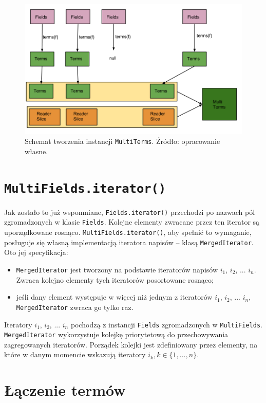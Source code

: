 \begin{figure}[here]
 \centering
 \includegraphics[scale=0.4]{pictures/MultiTerms.png}
 \caption{Schemat tworzenia instancji \texttt{MultiTerms}. Źródło: opracowanie własne. \label{fig:multiTerms}}
\end{figure}

\section{\texttt{MultiFields.iterator()}}

Jak zostało to już wspomniane, \texttt{Fields.iterator()} przechodzi po nazwach pól zgromadzonych w klasie \texttt{Fields}. Kolejne elementy zwracane przez ten iterator są uporządkowane rosnąco. \texttt{MultiFields.iterator()}, aby spełnić to wymaganie, posługuje się własną implementacją iteratora napisów -- klasą \texttt{MergedIterator}. Oto jej specyfikacja:
\begin{itemize}
 \item \texttt{MergedIterator} jest tworzony na podstawie iteratorów napisów $i_1$, $i_2$, ... $i_n$. Zwraca kolejno elementy tych iteratorów posortowane rosnąco; 
 \item jeśli dany element występuje w więcej niż jednym z iteratorów $i_1$, $i_2$, ... $i_n$, \texttt{MergedIterator} zwraca go tylko raz.
\end{itemize}
Iteratory $i_1$, $i_2$, ... $i_n$ pochodzą z instancji \texttt{Fields} zgromadzonych w \texttt{MultiFields}. \texttt{MergedIterator} wykorzystuje kolejkę priorytetową do przechowywania zagregowanych iteratorów. Porządek kolejki jest zdefiniowany przez elementy, na które w danym momencie wskazują iteratory $i_k, k \in \{1, ..., n\}$.

\section{Łączenie termów}
\label{sec:termsMerge}

